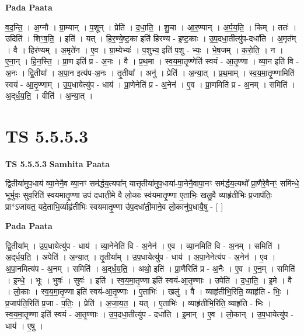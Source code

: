 \documentclass[17pt]{extarticle}
\begin{document}
\textbf{Pada Paata} \newline

व॒द॒न्ति॒ । अ॒ग्नौ । ग्रा॒म्यान् । प॒शून् । प्रेति॑ । द॒धा॒ति॒ । शु॒चा । आ॒र॒ण्यान् । अ॒र्प॒य॒ति॒ । किम् । ततः॑ । उदिति॑ । शिꣳ॒॒ष॒ति॒ । इति॑ । यत् । हि॒र॒ण्ये॒ष्ट॒का इति॑ हिरण्य - इ॒ष्ट॒काः । उ॒प॒दधा॒तीत्यु॑प-दधा॑ति । अ॒मृत᳚म् । वै । हिर॑ण्यम् । अ॒मृते॑न । ए॒व । ग्रा॒म्येभ्यः॑ । प॒शुभ्य॒ इति॑ प॒शु - भ्यः॒ । भे॒ष॒जम् । क॒रो॒ति॒ । न । ए॒ना॒न् । हि॒न॒स्ति॒ । प्रा॒ण इति॑ प्र - अ॒नः । वै । प्र॒थ॒मा । स्व॒य॒मा॒तृ॒ण्णेति॑ स्वयं -  आ॒तृ॒ण्णा । व्या॒न इति॑ वि - अ॒नः । द्वि॒तीया᳚ । अ॒पा॒न इत्य॑प-अ॒नः । तृ॒तीया᳚ । अनु॑ । प्रेति॑ । अ॒न्या॒त् । प्र॒थ॒माम् । स्व॒य॒मा॒तृ॒ण्णामिति॑ स्वयं - आ॒तृ॒ण्णाम् । उ॒प॒धायेत्यु॑प - धाय॑ । प्रा॒णेनेति॑ प्र - अ॒नेन॑ । ए॒व । प्रा॒णमिति॑ प्र - अ॒नम् । समिति॑ । अ॒द्‌र्ध॒य॒ति॒ । वीति॑ । अ॒न्या॒त् ।  \newline




\section*{ TS 5.5.5.3 }

\textbf{TS 5.5.5.3 } \newline
\textbf{Samhita Paata} \newline

द्वि॒तीया॑मुप॒धाय॑ व्या॒नेनै॒व व्या॒नꣳ सम॑र्द्धय॒त्यपा᳚न् यात्तृ॒तीया॑मुप॒धाया॑-पा॒नेनै॒वापा॒नꣳ सम॑र्द्धय॒त्यथो᳚ प्रा॒णैरे॒वैनꣳ॒॒ समि॑न्धे॒ भूर्भुवः॒ सुव॒रिति॑ स्वयमातृ॒ण्णा उप॑ दधाती॒मे वै लो॒काः स्व॑यमातृ॒ण्णा ए॒ताभिः॒ खलु॒वै व्याहृ॑तीभिः प्र॒जाप॑तिः॒ प्रा*ऽजा॑यत॒ यदे॒ताभि॒र्व्याहृ॑तीभिः स्वयमातृ॒ण्णा उ॑प॒दधा॑ती॒माने॒व लो॒कानु॑प॒धायै॒षु - [  ] \newline

\textbf{Pada Paata} \newline

द्वि॒तीया᳚म् । उ॒प॒धायेत्यु॑प - धाय॑ । व्या॒नेनेति॑ वि - अ॒नेन॑ । ए॒व । व्या॒नमिति॑ वि - अ॒नम् । समिति॑ । अ॒द्‌र्ध॒य॒ति॒ । अपेति॑ । अ॒न्या॒त् । तृ॒तीया᳚म् । उ॒प॒धायेत्यु॑प - धाय॑ । अ॒पा॒नेनेत्य॑प - अ॒नेन॑ । ए॒व । अ॒पा॒नमित्य॑प - अ॒नम् । समिति॑ । अ॒द्‌र्ध॒य॒ति॒ । अथो॒ इति॑ । प्रा॒णैरिति॑ प्र - अ॒नैः । ए॒व । ए॒न॒म् । समिति॑ । इ॒न्धे॒ । भूः । भुवः॑ । सुवः॑ । इति॑ । स्व॒य॒मा॒तृ॒ण्णा इति॑ स्वयं-आ॒तृ॒ण्णाः । उपेति॑ । द॒धा॒ति॒ । इ॒मे । वै । लो॒काः । स्व॒य॒मा॒तृ॒ण्णा इति॑ स्वयं-आ॒तृ॒ण्णाः । ए॒ताभिः॑ । खलु॑ । वै । व्याहृ॑तीभि॒रिति॒ व्याहृ॑ति - भिः॒ । प्र॒जाप॑ति॒रिति॑ प्र॒जा - प॒तिः॒ । प्रेति॑ । अ॒जा॒य॒त॒ । यत् । ए॒ताभिः॑ । व्याहृ॑तीभि॒रिति॒ व्याहृ॑ति - भिः । स्व॒य॒मा॒तृ॒ण्णा इति॑ स्वयं - आ॒तृ॒ण्णाः । उ॒प॒दधा॒तीत्यु॑प - दधा॑ति । इ॒मान् । ए॒व । लो॒कान् । उ॒प॒धायेत्यु॑प - धाय॑ । ए॒षु ।  \newline
\end{document}
